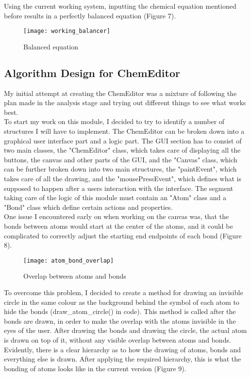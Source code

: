 \documentclass[a4paper,12pt]{article}
\begin{document}
Using the current working system, inputting the chemical equation mentioned before results in a perfectly balanced equation (Figure 7).

\begin{figure} [h]
	\centering
	\texttt{[image: working\_balancer]}
	\caption{Balanced equation}
	\label{fig:working_balancer}
\end{figure}

\newpage

\subsection{Algorithm Design for ChemEditor}

My initial attempt at creating the ChemEditor was a mixture of following the plan made in the analysis stage and trying out different things to see what works best.\\
To start my work on this module, I decided to try to identify a number of structures I will have to implement. The ChemEditor can be broken down into a graphical user interface part and a logic part. The GUI section has to consist of two main classes, the "ChemEditor" class, which takes care of displaying all the buttons, the canvas and other parts of the GUI, and the "Canvas" class, which can be further broken down into two main structures, the "paintEvent", which takes care of all the drawing, and the "mousePressEvent", which defines what is supposed to happen after a users interaction with the interface. The segment taking care of the logic of this module must contain an "Atom" class and a "Bond" class which define certain actions and properties.\\
\linebreak
One issue I encountered early on when working on the canvas was, that the bonds between atoms would start at the center of the atoms, and it could be complicated to correctly adjust the starting end endpoints of each bond (Figure 8).

\begin{figure} [h]
	\centering
	\texttt{[image: atom\_bond\_overlap]}
	\caption{Overlap between atoms and bonds}
	\label{fig:atom_bond_overlap}
\end{figure}

To overcome this problem, I decided to create a method for drawing an invisible circle in the same colour as the background behind the symbol of each atom to hide the bonds (draw\_atom\_circle() in code). This method is called after the bonds are drawn, in order to make the overlap with the atoms invisible in the eyes of the user. After drawing the bonds and drawing the circle, the actual atom is drawn on top of it, without any visible overlap between atoms and bonds. Evidently, there is a clear hierarchy as to how the drawing of atoms, bonds and everything else is drawn. After applying the required hierarchy, this is what the bonding of atoms looks like in the current version (Figure 9).
\end{document}
